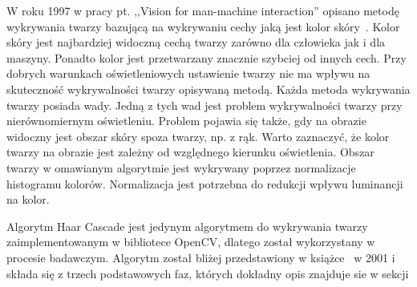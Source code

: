 \documentclass[a4paper,twoside,12pt]{book}
\begin{document}
    W roku 1997 w pracy pt. ,,Vision for man-machine interaction'' opisano metodę wykrywania twarzy bazującą na
    wykrywaniu cechy jaką jest kolor skóry~\cite{clowleyCoutaz}.
    Kolor skóry jest najbardziej widoczną cechą twarzy zarówno dla człowieka jak i dla maszyny.
    Ponadto kolor jest przetwarzany znacznie szybciej od innych cech.
    Przy dobrych warunkach oświetleniowych ustawienie twarzy nie ma wpływu na skuteczność wykrywalności twarzy
    opisywaną metodą.
    Każda metoda wykrywania twarzy posiada wady.
    Jedną z tych wad jest problem wykrywalności twarzy przy nierównomiernym oświetleniu.
    Problem pojawia się także, gdy na obrazie widoczny jest obszar skóry spoza twarzy, np. z rąk.
    Warto zaznaczyć, że kolor twarzy na obrazie jest zależny od względnego kierunku oświetlenia.
    Obszar twarzy w omawianym algorytmie jest wykrywany poprzez normalizacje histogramu kolorów.
    Normalizacja jest potrzebna do redukcji wpływu luminancji na kolor.

    Algorytm Haar Cascade jest jedynym algorytmem do wykrywania twarzy zaimplementowanym w bibliotece OpenCV,
    dlatego został wykorzystany w procesie badawczym.
    Algorytm został bliżej przedstawiony w książce~\cite{violaJones} w 2001 i składa się z trzech podstawowych faz,
    których dokładny opis znajduje sie w sekcji %

\end{document}
